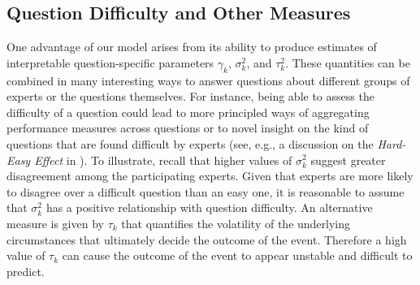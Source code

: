 \documentclass[aoas, preprint]{imsart}
\numberwithin{equation}{section}
\theoremstyle{plain}
\begin{document}








\subsection{Question Difficulty and Other Measures}
\label{QuestionDifficulty}
One advantage of our model arises from its ability to produce estimates of interpretable question-specific parameters $\gamma_k$, $\sigma^2_k$, and $\tau^2_k$. These quantities can be combined in many interesting ways to answer questions about different groups of experts or the questions themselves. For instance, being able to assess the difficulty of a question could lead to more principled ways of aggregating performance measures across questions or to novel insight on the kind of questions that are found difficult by experts (see, e.g., a discussion on the \textit{Hard-Easy Effect} in \cite{Wilson94cognitivefactors}). To illustrate, recall that higher values of $\sigma^2_k$ suggest greater disagreement among the participating experts. Given that experts are more likely to disagree over a difficult question than an easy one, it is reasonable to assume that $\sigma^2_k$ has a positive relationship with question difficulty. An alternative measure is given by $\tau_k$ that quantifies the volatility of the underlying circumstances that ultimately decide the outcome of the event. Therefore a high value of $\tau_k$ can cause the outcome of the event to appear unstable and difficult to predict. 
\end{document}
